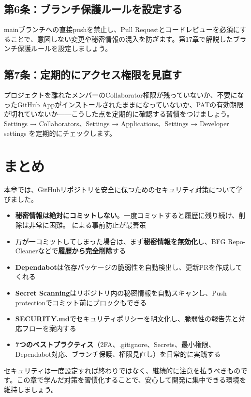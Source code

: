 \subsection{第6条：ブランチ保護ルールを設定する}

mainブランチへの直接pushを禁止し、Pull Requestとコードレビューを必須にすることで、意図しない変更や秘密情報の混入を防ぎます。第17章で解説したブランチ保護ルールを設定しましょう。

\subsection{第7条：定期的にアクセス権限を見直す}

プロジェクトを離れたメンバーのCollaborator権限が残っていないか、不要になったGitHub Appがインストールされたままになっていないか、PATの有効期限が切れていないか------こうした点を定期的に確認する習慣をつけましょう。Settings → Collaborators、Settings → Applications、Settings → Developer settings を定期的にチェックします。

\section{まとめ}

本章では、GitHubリポジトリを安全に保つためのセキュリティ対策について学びました。

\begin{itemize}
  \item \textbf{秘密情報は絶対にコミットしない}。一度コミットすると履歴に残り続け、削除は非常に困難。 による事前防止が最善策
  \item 万が一コミットしてしまった場合は、まず\textbf{秘密情報を無効化}し、BFG Repo-Cleanerなどで\textbf{履歴から完全削除}する
  \item \textbf{Dependabot}は依存パッケージの脆弱性を自動検出し、更新PRを作成してくれる
  \item \textbf{Secret Scanning}はリポジトリ内の秘密情報を自動スキャンし、Push protectionでコミット前にブロックもできる
  \item \textbf{SECURITY.md}でセキュリティポリシーを明文化し、脆弱性の報告先と対応フローを案内する
  \item \textbf{7つのベストプラクティス}（2FA、.gitignore、Secrets、最小権限、Dependabot対応、ブランチ保護、権限見直し）を日常的に実践する
\end{itemize}

セキュリティは一度設定すれば終わりではなく、継続的に注意を払うべきものです。この章で学んだ対策を習慣化することで、安心して開発に集中できる環境を維持しましょう。
